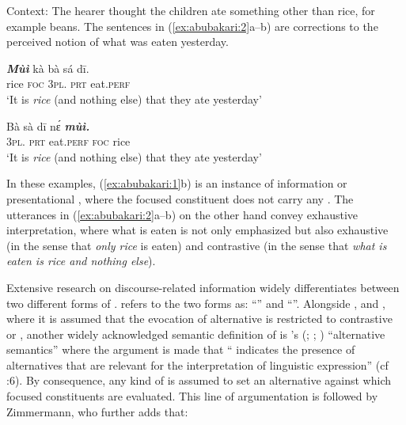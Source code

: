 \documentclass[output=paper,modfonts,nonflat,
 hidelinks
]{langsci/langscibook}
\begin{document}
Context: The hearer thought the children ate something other than rice, for example beans. The sentences in (\ref{ex:abubakari:2}a--b) are corrections to the perceived notion of what was eaten yesterday. 
 
 
\ea\label{ex:abubakari:2}
\ea\label{ex:abubakari:2a}
\gll \textbf{\textit{Mùì} }kà  bà  sá  dī.  \\ 
rice  \textsc{foc}  3\textsc{pl}.  \textsc{prt}  eat.\textsc{perf}   \\                  
\glt ‘It is \textit{rice} (and nothing else) that they ate yesterday’    

\ex\label{ex:abubakari:2b}
\gll Bà  sà  dī    nɛ́ \textbf{\textit{mùì.}}\\
3\textsc{pl}.  \textsc{prt}  eat.\textsc{perf}  \textsc{foc}  rice\\
\glt ‘It is \textit{rice} (and nothing else) that they ate yesterday’
\z
\z

In these examples, (\ref{ex:abubakari:1}b) is an instance of information or presentational , where the focused constituent does not carry any . The utterances in (\ref{ex:abubakari:2}a--b) on the other hand convey exhaustive interpretation, where what is eaten is not only emphasized but also exhaustive (in the sense that \textit{only rice} is eaten) and contrastive (in the sense that \textit{what is eaten is rice and nothing else}). 

Extensive research on discourse-related information widely differentiates between two different forms of  \citep{Halliday1967, chafe1976,szabolcsi1981,michael1986,ÉKiss1998,Vallduví1998,Molnár2002}. \citet{ÉKiss1998} refers to the two forms as: “” and  “”. Alongside \citet{ÉKiss1998}, \citet{Vallduví1998} and \citet{selkirk2008}, where it is assumed that the evocation of alternative is restricted to contrastive or , another widely acknowledged semantic definition of  is \citeauthor{rooth1985}’s (\citeyear{rooth1985}; \citeyear{Rooth1992}; \citeyear{rooth1996}) “alternative semantics” where the argument is made that “ indicates the presence of alternatives that are relevant for the interpretation of linguistic expression” (cf \citealt{krifka2007}:6).  By consequence, any kind of  is assumed to set an alternative against which focused constituents are evaluated. This line of argumentation is followed by Zimmermann, who further adds that: 
\end{document}
